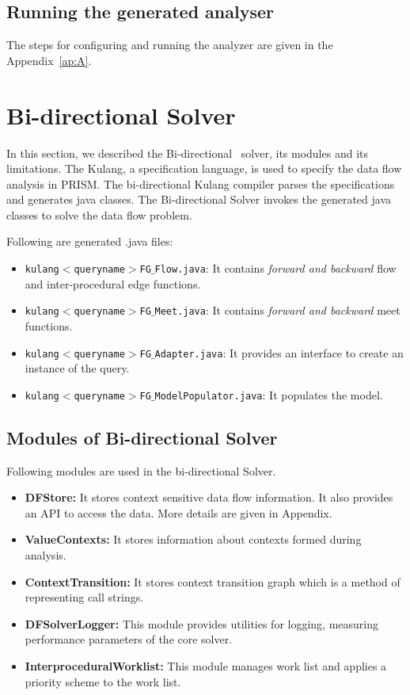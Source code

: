 \documentclass[11pt,a4paper,openright]{report}
\begin{document}
\subsection{Running the generated analyser}
The steps for configuring and running the analyzer are given in the Appendix~\ref{ap:A}.

\section{Bi-directional Solver}
In this section, we described the Bi-directional~\cite{thesis_v} solver, its modules and its limitations.
The Kulang, a specification language, is used to specify the data flow analysis in PRISM. The bi-directional Kulang compiler parses the specifications
and generates java classes. The Bi-directional Solver invokes the generated java classes to solve the data flow problem.

Following are generated .java files:
\begin{itemize}
 \item \texttt{kulang$<$queryname$>$FG$\_$Flow.java}: It contains \textit{forward and backward} flow and inter-procedural edge functions.  
 \item \texttt{kulang$<$queryname$>$FG$\_$Meet.java}: It contains \textit{forward and backward} meet functions.
 \item \texttt{kulang$<$queryname$>$FG$\_$Adapter.java}: It provides an interface to create an instance of the query. 
 \item \texttt{kulang$<$queryname$>$FG$\_$ModelPopulator.java}: It populates the model.
\end{itemize}


\subsection{Modules of Bi-directional Solver}
Following modules are used in the bi-directional Solver.
\begin{itemize}
 \item \textbf{DFStore:} It stores context sensitive data flow information. It also provides an API to access the data. More details are given in Appendix.
 \item \textbf{ValueContexts:} It stores information about contexts formed during analysis.
 \item \textbf{ContextTransition:} It stores context transition graph which is a method of representing call strings.
 \item \textbf{DFSolverLogger:} This module provides utilities for logging, measuring performance parameters of the core solver.
 \item \textbf{InterproceduralWorklist:} This module manages work list and applies a priority scheme to the work list.
\end{itemize}
\end{document}
